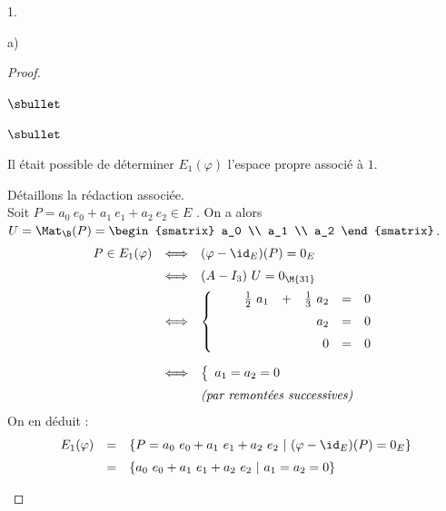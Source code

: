 \begin{noliste}{1.}
\begin{noliste}{a)}
\begin{proof}
\begin{noliste}{$\sbullet$}
        \begin{remark}%
          \begin{noliste}{$\sbullet$}
          \item Il était possible de déterminer $E_1(\varphi)$
            l'espace propre associé à $1$.
          \item Détaillons la rédaction associée.\\
            Soit $P = a_0 \ e_0 + a_1 \ e_1 + a_2 \ e_2 \in E$ . On a
            alors $U = \Mat_{\B}(P) =
            \begin{smatrix}
              a_0 \\
              a_1 \\
              a_2
            \end{smatrix}
            $.
            \[
            \begin{array}{rcl}
              P \in E_1(\varphi) 
              & \Longleftrightarrow & (\varphi - \id_E)(P) = 0_E 
              \\[.2cm]
              & \Longleftrightarrow & (A - I_3) \ U = 0_{\M{31}}
              \\[.2cm]
              & \Longleftrightarrow & 
              \left\{
                \begin{array}{rcrcrcr}
                  & & \frac{1}{2} \ a_1 & + & \frac{1}{3} \ a_2 & = & 0
                  \\[.2cm]
                  & & & & a_2 & = & 0
                  \\[.2cm]
                  & & & & 0 & = & 0
                \end{array}
              \right.
              \\[1cm]
              & \Longleftrightarrow & 
              \left\{
                \begin{array}{l}
                  a_1 = a_2 = 0
                \end{array}
              \right.
              \\[.2cm]
              & & \text{\it (par remontées successives)}
            \end{array}
            \]
            On en déduit :
            \[
            \begin{array}{rcl}
              E_1(\varphi) & = & \{ P = a_0 \ e_0 + a_1 \ e_1 + a_2 \ e_2 \
              | \ (\varphi - \id_E)(P) = 0_E \}
              \\[.2cm]
              & = & \{ a_0 \ e_0 + a_1 \ e_1 + a_2 \ e_2 \
              | \ a_1 = a_2 = 0 \}

\end{array}\]
\end{noliste}
\end{remark}
\end{noliste}
\end{proof}
\end{noliste}
\end{noliste}
